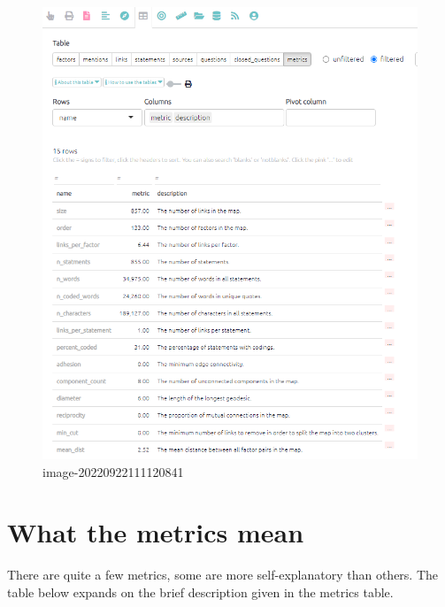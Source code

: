 \documentclass[
]{book}
\begin{document}
\begin{figure}
\centering
\includegraphics[width=6.77083in,height=\textheight]{_assets/image-20220922111120841.png}
\caption{image-20220922111120841}
\end{figure}

\hypertarget{what-the-metrics-mean-1}{%
\section{What the metrics mean}\label{what-the-metrics-mean-1}}

There are quite a few metrics, some are more self-explanatory than others. The table below expands on the brief description given in the metrics table.
\end{document}
